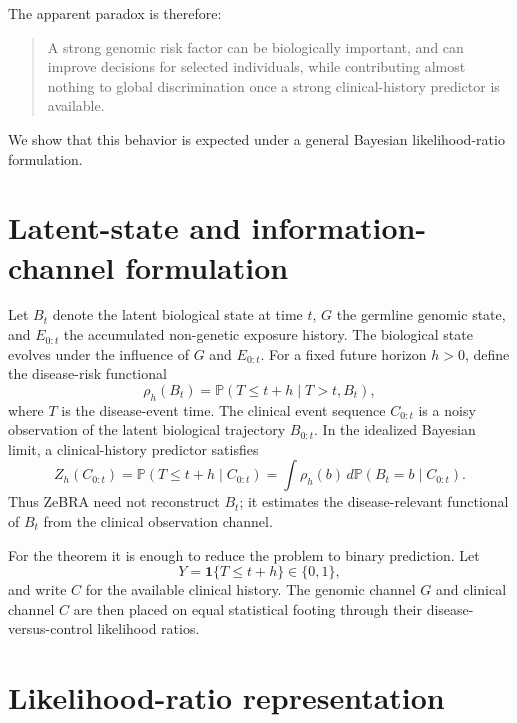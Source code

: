 \documentclass[journal]{IEEEtran}
\newcommand{\ind}{\mathbf{1}}
\begin{document}
The apparent paradox is therefore:
\begin{quote}
A strong genomic risk factor can be biologically important, and can improve decisions for selected individuals, while contributing almost nothing to global discrimination once a strong clinical-history predictor is available.
\end{quote}

We show that this behavior is expected under a general Bayesian likelihood-ratio formulation.

\section{Latent-state and information-channel formulation}

Let $B_t$ denote the latent biological state at time $t$, $G$ the germline genomic state, and $E_{0:t}$ the accumulated non-genetic exposure history. The biological state evolves under the influence of $G$ and $E_{0:t}$. For a fixed future horizon $h>0$, define the disease-risk functional
\begin{equation}
\rho_h(B_t)
=\mathbb{P}(T\le t+h\mid T>t,B_t),
\label{eq:rho}
\end{equation}
where $T$ is the disease-event time. The clinical event sequence $C_{0:t}$ is a noisy observation of the latent biological trajectory $B_{0:t}$. In the idealized Bayesian limit, a clinical-history predictor satisfies
\begin{equation}
Z_h(C_{0:t})
=\mathbb{P}(T\le t+h\mid C_{0:t})
=\int \rho_h(b)\,d\mathbb{P}(B_t=b\mid C_{0:t}).
\label{eq:zposterior}
\end{equation}
Thus ZeBRA need not reconstruct $B_t$; it estimates the disease-relevant functional of $B_t$ from the clinical observation channel.

For the theorem it is enough to reduce the problem to binary prediction. Let
\begin{equation}
Y=\ind\{T\le t+h\}\in\{0,1\},
\end{equation}
and write $C$ for the available clinical history. The genomic channel $G$ and clinical channel $C$ are then placed on equal statistical footing through their disease-versus-control likelihood ratios.

\section{Likelihood-ratio representation}
\end{document}
